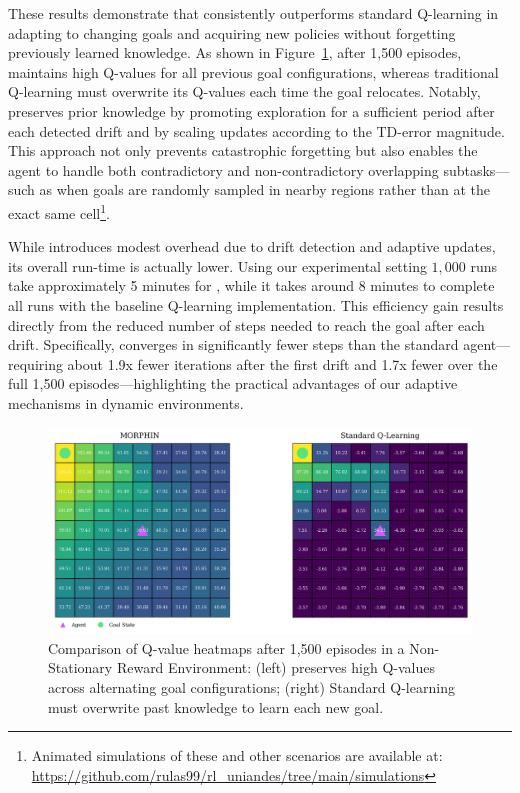 These results demonstrate that \adaptiverl consistently outperforms standard Q-learning in adapting to changing goals and acquiring new policies without forgetting previously learned knowledge. As shown in Figure~\ref{fig:q-value-comp}, after 1,500 episodes, \adaptiverl maintains high Q-values for all previous goal configurations, whereas traditional Q-learning must overwrite its Q-values each time the goal relocates. Notably, \adaptiverl preserves prior knowledge by promoting exploration for a sufficient period after each detected drift and by scaling updates according to the TD-error magnitude. This approach not only prevents catastrophic forgetting but also enables the agent to handle both contradictory and non-contradictory overlapping subtasks---such as when goals are randomly sampled in nearby regions rather than at the exact same cell\footnote{Animated simulations of these and other scenarios are available at: \url{https://github.com/rulas99/rl_uniandes/tree/main/simulations}}.

While \adaptiverl introduces modest overhead due to drift detection and adaptive updates, its overall 
run-time is actually lower. Using our experimental setting $1,000$ runs take approximately 5
minutes for \adaptiverl, while it takes around 8 minutes to complete all runs with the baseline Q-learning implementation. This efficiency gain results directly from the reduced number of steps needed to reach the goal after each drift. Specifically, \adaptiverl converges in significantly fewer steps than the standard agent---requiring about 1.9x fewer iterations after the first drift and 1.7x fewer over the full 1,500 episodes---highlighting the practical advantages of our adaptive mechanisms in dynamic environments.

\begin{figure}
    \centering
    \includegraphics[width=\textwidth]{figures/q_map_comp}
    \caption{Comparison of Q-value heatmaps after 1,500 episodes in a Non-Stationary Reward Environment: (left) \adaptiverl preserves high Q-values across alternating goal configurations; (right) Standard Q-learning must overwrite past knowledge to learn each new goal.}
    \label{fig:q-value-comp}
\end{figure}

